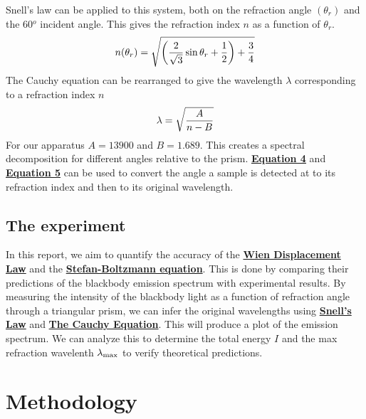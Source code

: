 \documentclass[
	letterpaper
	12pt
]{template}
\newcommand{\bref}[2]{\textbf{\hyperref[#1]{#2}}}
\begin{document}
Snell's law can be applied to this system, both on the refraction angle $(\theta_r)$ and the $60\unit{^o}$ incident angle. This gives the refraction index $n$ as a function of $\theta_r$. \cite{labManual}
\begin{equation}\label{eqn::index}
n(\theta_r) = \sqrt{\left({2\over \sqrt 3}\sin\theta_r + {1\over 2} \right) + {3\over 4}}
\end{equation}
The Cauchy equation can be rearranged to give the wavelength $\lambda$ corresponding to a refraction index $n$ \cite{labManual}
\begin{equation}\label{eqn::cauchy}
	\lambda = \sqrt{A\over {n-B}}
\end{equation}
For our apparatus $A = 13900$ and $B=1.689$. This creates a spectral decomposition for different angles relative to the prism. \bref{eqn::index}{Equation 4} and \bref{eqn::cauchy}{Equation 5} can be used to convert the angle a sample is detected at to its refraction index and then to its original wavelength.
\subsection{The experiment}
In this report, we aim to quantify the accuracy of the \bref{eqn::wien}{Wien Displacement Law} and the \bref{eqn::stefan}{Stefan-Boltzmann equation}. This is done by comparing their predictions of the blackbody emission spectrum with experimental results. By measuring the intensity of the blackbody light as a function of refraction angle through a triangular prism, we can infer the original wavelengths using \bref{eqn::index}{Snell's Law} and \bref{eqn::cauchy}{The Cauchy Equation}. This will produce a plot of the emission spectrum. We can analyze this to determine the total energy $I$ and the max refraction wavelenth $\lambda_{\rm max}$ to verify theoretical predictions.
\section{Methodology}
\end{document}
